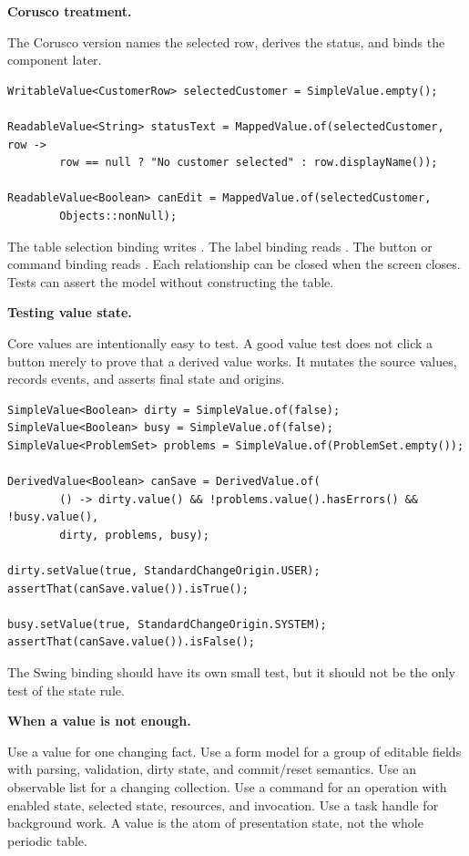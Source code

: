 \textbf{Corusco treatment.}

The Corusco version names the selected row, derives the status, and binds the
component later.

\begin{lstlisting}[caption={Value-owned status.}]
WritableValue<CustomerRow> selectedCustomer = SimpleValue.empty();

ReadableValue<String> statusText = MappedValue.of(selectedCustomer, row ->
        row == null ? "No customer selected" : row.displayName());

ReadableValue<Boolean> canEdit = MappedValue.of(selectedCustomer,
        Objects::nonNull);
\end{lstlisting}

The table selection binding writes . The label binding
reads . The button or command binding reads . Each
relationship can be closed when the screen closes. Tests can assert the model
without constructing the table.

\textbf{Testing value state.}

Core values are intentionally easy to test. A good value test does not click a
button merely to prove that a derived value works. It mutates the source values,
records events, and asserts final state and origins.

\begin{lstlisting}[caption={Testing derived state directly.}]
SimpleValue<Boolean> dirty = SimpleValue.of(false);
SimpleValue<Boolean> busy = SimpleValue.of(false);
SimpleValue<ProblemSet> problems = SimpleValue.of(ProblemSet.empty());

DerivedValue<Boolean> canSave = DerivedValue.of(
        () -> dirty.value() && !problems.value().hasErrors() && !busy.value(),
        dirty, problems, busy);

dirty.setValue(true, StandardChangeOrigin.USER);
assertThat(canSave.value()).isTrue();

busy.setValue(true, StandardChangeOrigin.SYSTEM);
assertThat(canSave.value()).isFalse();
\end{lstlisting}

The Swing binding should have its own small test, but it should not be the only
test of the state rule.

\textbf{When a value is not enough.}

Use a value for one changing fact. Use a form model for a group of editable
fields with parsing, validation, dirty state, and commit/reset semantics. Use an
observable list for a changing collection. Use a command for an operation with
enabled state, selected state, resources, and invocation. Use a task handle for
background work. A value is the atom of presentation state, not the whole
periodic table.

